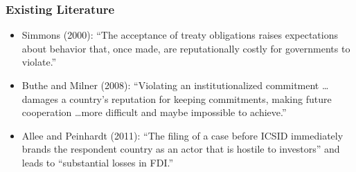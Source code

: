 \documentclass[10pt]{beamer}
\begin{document}
\begin{frame}
\frametitle{Existing Literature}

\begin{itemize}
	\item Simmons (2000): ``The acceptance of treaty obligations raises expectations about behavior that, once made, are reputationally costly for governments to violate.'' 
	\item Buthe and Milner (2008): ``Violating an institutionalized commitment \ldots damages a country's reputation for keeping commitments, making future cooperation \ldots more difficult and maybe impossible to achieve.'' 
	\item Allee and Peinhardt (2011): ``The filing of a case before ICSID immediately brands the respondent country as an actor that is hostile to investors'' and leads to ``substantial losses in FDI.''
\end{itemize}



\end{frame}
\end{document}
